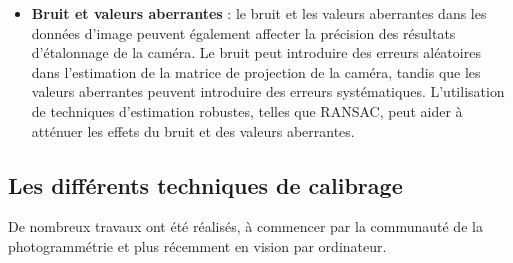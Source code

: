 \begin{itemize}
	\item \textbf{Bruit et valeurs aberrantes} :  le bruit et les valeurs aberrantes dans les données d’image peuvent également affecter la précision des résultats d’étalonnage de la caméra. Le bruit peut introduire des erreurs aléatoires dans l’estimation de la matrice de projection de la caméra, tandis que les valeurs aberrantes peuvent introduire des erreurs systématiques. L’utilisation de techniques d’estimation robustes, telles que RANSAC, peut aider à atténuer les effets du bruit et des valeurs aberrantes.
\end{itemize}


\subsection{Les différents techniques de calibrage}

 De nombreux travaux ont été réalisés, à commencer par la communauté de la photogrammétrie et plus récemment en vision par ordinateur.\\
 
